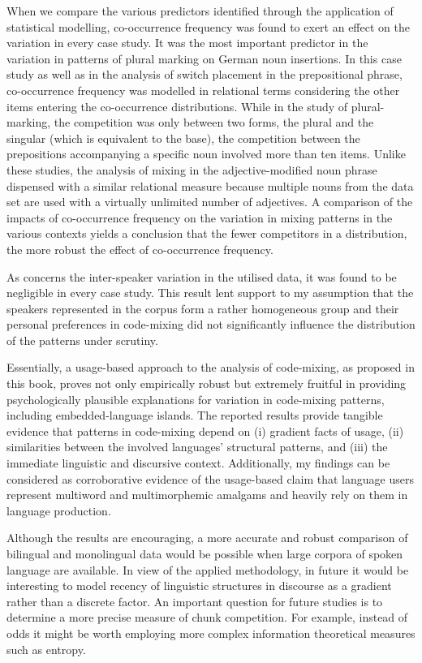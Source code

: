 When we compare the various predictors identified through the application of statistical modelling, co-occurrence frequency was found to exert an effect on the variation in every case study. It was the most important predictor in the variation in patterns of plural marking on German noun insertions. In this case study as well as in the analysis of switch placement in the prepositional phrase, co-occurrence frequency was modelled in relational terms considering the other items entering the co-occurrence distributions. While in the study of plural-marking, the competition was only between two forms, the plural and the singular (which is equivalent to the base), the competition between the prepositions accompanying a specific noun involved more than ten items. Unlike these studies, the analysis of mixing in the adjective-modified noun phrase dispensed with a similar relational measure because multiple nouns from the data set are used with a virtually unlimited number of adjectives. A comparison of the impacts of co-occurrence frequency on the variation in mixing patterns in the various contexts yields a conclusion that the fewer competitors in a distribution, the more robust the effect of co-occurrence frequency.

As concerns the inter-speaker variation in the utilised data, it was found to be negligible in every case study. This result lent support to my assumption that the speakers represented in the corpus form a rather homogeneous group and their personal preferences in code-mixing did not significantly influence the distribution of the patterns under scrutiny. 

Essentially, a usage-based approach to the analysis of code-mixing, as proposed in this book, proves not only empirically robust but extremely fruitful in providing psychologically plausible explanations for variation in code-mixing patterns, including embedded-language islands. The reported results provide tangible evidence that patterns in code-mixing depend on (i) gradient facts of usage, (ii) similarities between the involved languages’ structural patterns, and (iii) the immediate linguistic and discursive context. Additionally, my findings can be considered as corroborative evidence of the usage-based claim that language users represent multiword and multimorphemic amalgams and heavily rely on them in language production.

Although the results are encouraging, a more accurate and robust comparison of bilingual and monolingual data would be possible when large corpora of spoken language are available. In view of the applied methodology, in future it would be interesting to model recency of linguistic structures in discourse as a gradient rather than a discrete factor. An important question for future studies is to determine a more precise measure of chunk competition. For example, instead of odds it might be worth employing more complex information theoretical measures such as entropy. 


